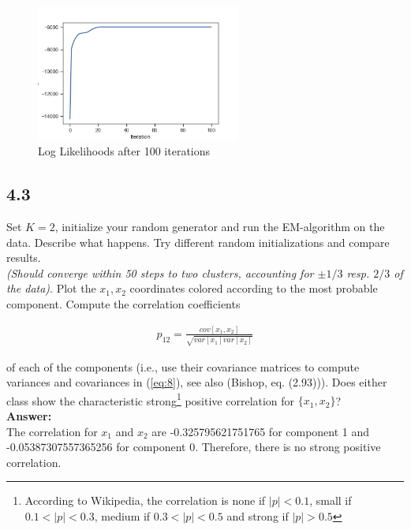 \documentclass[a4paper]{article}
\begin{document}
\begin{figure}[H]
\center
\includegraphics[width=0.6\textwidth]{Images/figure_4_2_log_likelihoods.png}
\caption{Log Likelihoods after 100 iterations}
\label{Fig:log_likelihoods}
\end{figure}



\subsection*{4.3}

Set $K = 2$, initialize your random generator and run the EM-algorithm on the data. Describe what happens. Try different random initializations and compare results.\\
\textit{(Should converge within 50 steps to two clusters, accounting for $\pm 1/3$ resp. $2/3$ of the data)}. Plot the $x_1, x_2$ coordinates colored according to the most probable component. Compute the correlation coefficients 

\begin{eqnarray} \label{eq:8}
p_{12} = \frac{cov[x_1, x_2]}{\sqrt{var[x_1] var[x_2]}}
\end{eqnarray}

of each of the components (i.e., use their covariance matrices to compute variances and covariances in (\ref{eq:8}), see also (Bishop, eq. (2.93))). Does either class show the characteristic strong\footnote{According to Wikipedia, the correlation is none if $|p| < 0.1$, small if $0.1 < |p| < 0.3$, medium if $0.3 < |p| < 0.5$ and strong if $|p| > 0.5$} positive correlation for $\{ x_1, x_2\}$?\\


\textbf{Answer:}\\




The correlation for $x_1$ and $x_2$ are -0.325795621751765 for component  1 and -0.05387307557365256 for component 0. Therefore, there is no strong positive correlation.\\
\end{document}
